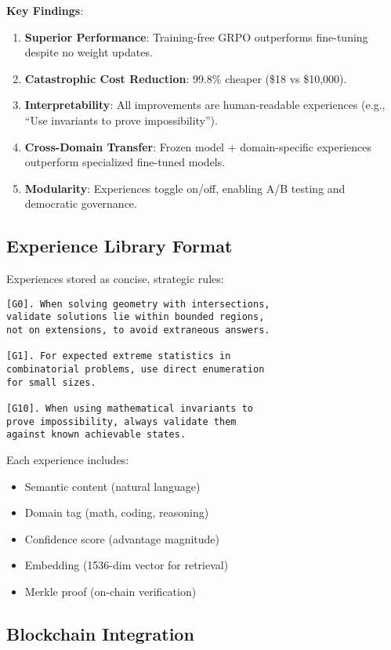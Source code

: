 \documentclass[twocolumn,11pt]{article}
\begin{document}
\textbf{Key Findings}:
\begin{enumerate}
    \item \textbf{Superior Performance}: Training-free GRPO outperforms fine-tuning despite no weight updates.
    \item \textbf{Catastrophic Cost Reduction}: 99.8\% cheaper (\$18 vs \$10,000).
    \item \textbf{Interpretability}: All improvements are human-readable experiences (e.g., ``Use invariants to prove impossibility'').
    \item \textbf{Cross-Domain Transfer}: Frozen model + domain-specific experiences outperform specialized fine-tuned models.
    \item \textbf{Modularity}: Experiences toggle on/off, enabling A/B testing and democratic governance.
\end{enumerate}

\subsection{Experience Library Format}

Experiences stored as concise, strategic rules:

\begin{verbatim}
[G0]. When solving geometry with intersections,
validate solutions lie within bounded regions,
not on extensions, to avoid extraneous answers.

[G1]. For expected extreme statistics in
combinatorial problems, use direct enumeration
for small sizes.

[G10]. When using mathematical invariants to
prove impossibility, always validate them
against known achievable states.
\end{verbatim}

Each experience includes:
\begin{itemize}
    \item Semantic content (natural language)
    \item Domain tag (math, coding, reasoning)
    \item Confidence score (advantage magnitude)
    \item Embedding (1536-dim vector for retrieval)
    \item Merkle proof (on-chain verification)
\end{itemize}

\subsection{Blockchain Integration}
\end{document}

